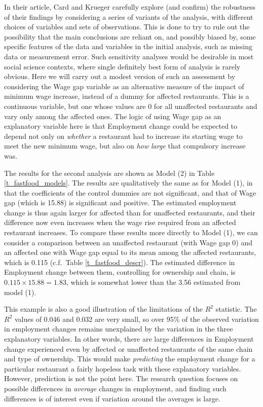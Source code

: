 In their article, Card and Krueger carefully explore (and confirm) the
robustness of their findings by considering a series of variants of the
analysis, with different choices of variables and sets of observations.
This is done to try to rule out the possibility that the main
conclusions are reliant on, and possibly biased by, some specific
features of the data and variables in the initial analysis, such as
missing data or measurement error. Such sensitivity analyses would be
desirable in most social science contexts, where single definitely best
form of analysis is rarely obvious. Here we will carry out a modest
version of such an assessment by considering the Wage gap variable as an
alternative measure of the impact of minimum wage increase, instead of a
dummy for affected restaurants. This is a continuous variable, but
one whose values are 0 for all unaffected restaurants and vary only
among the affected ones. The logic of using Wage gap as an explanatory
variable here is that Employment change could be expected  to depend not
only on \emph{whether} a restaurant had to increase its starting wage to
meet the new minimum wage, but also on \emph{how large} that compulsory
increase was.

The results for the second analysis are shown as Model (2) in Table
\ref{t_fastfood_models}. The results are qualitatively the same as for
Model (1), in that the coefficients of the control dummies are not
significant, and that of Wage gap (which is 15.88) is significant and
positive. The estimated employment change is thus again larger for
affected than for unaffected restaurants, and their difference now even
increases when the wage rise required from an affected restaurant
increases. To compare these results more directly to Model (1), we can
consider a comparison between an unaffected restaurant (with Wage gap 0)
and an affected one with Wage gap equal to its mean among the affected
restaurants, which is 0.115 (c.f.\ Table \ref{t_fastfood_descr}). The
estimated difference in Employment change between them, controlling for
ownership and chain, is $0.115\times 15.88=1.83$, which is somewhat
lower than the 3.56 estimated from model (1).

This example is also a good illustration of the limitations of the
$R^{2}$ statistic. The $R^{2}$ values of 0.046 and 0.032 are very small,
so over 95\% of the observed variation in employment changes remains
unexplained by the variation in the three explanatory variables. In
other words, there are large differences in Employment change
experienced even by affected or unaffected restaurants of the same chain
and type of ownership. This would make \emph{predicting} the employment
change for a particular restaurant a fairly hopeless task with these
explanatory variables. However, prediction is not the point here. The
research question focuses on possible differences in \emph{average}
changes in employment, and finding such differences is of interest even
if variation around the averages is large.

